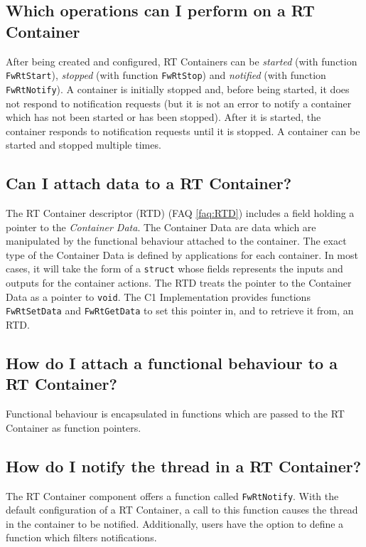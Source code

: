 \documentclass[a4paper,10pt]{article}
\begin{document}
\subsection{Which operations can I perform on a RT Container}
After being created and configured, RT Containers can be \emph{started} (with function \texttt{FwRtStart}), \emph{stopped} (with function 
\texttt{FwRtStop}) and \emph{notified} (with function \texttt{FwRtNotify}). A container is initially stopped and, before being started, 
it does not respond to notification requests (but it is not an error to notify a container which has not been started or has been stopped). 
After it is started, the container responds to notification requests until it is stopped. A container can be started and stopped multiple times.

\subsection{Can I attach data to a RT Container?}\label{faq:container_data}
The RT Container descriptor (RTD) (FAQ \ref{faq:RTD}) includes a field holding a pointer to the \emph{Container Data}. The Container Data are data which are manipulated 
by the functional behaviour attached to the container. The exact type of the Container Data is defined by applications for each container. In most cases, it will take 
the form of a \texttt{struct} whose fields represents the inputs and outputs for the container actions. The RTD treats the pointer to the Container Data as a pointer to \texttt{void}. The C1 Implementation provides functions \texttt{FwRtSetData} and \texttt{FwRtGetData} to set this pointer in, and to retrieve it from, an RTD.

\subsection{How do I attach a functional behaviour to a RT Container?}
Functional behaviour is encapsulated in functions which are passed to the RT Container as function pointers. 

\subsection{How do I notify the thread in a RT Container?}
The RT Container component offers a function called \texttt{FwRtNotify}. With the default configuration of a RT Container, a call to this function causes the thread in the container to be notified. Additionally, users have the option to define a function which filters notifications. 
\end{document}
